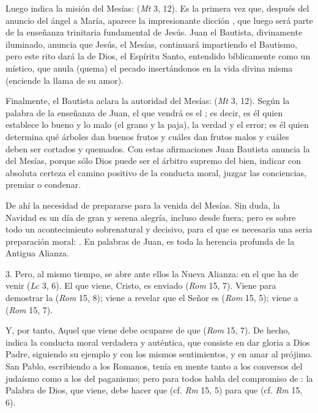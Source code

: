 \begin{body}
	Luego indica la misión del Mesías:  (\emph{Mt} 3, 12). Es la primera vez que, después del anuncio del ángel a María, aparece la impresionante dicción , que luego será parte de la enseñanza trinitaria fundamental de Jesús. Juan el Bautista, divinamente iluminado, anuncia que Jesús, el Mesías, continuará impartiendo el Bautismo, pero este rito dará la  de Dios, el Espíritu Santo, entendido bíblicamente como un  místico, que anula (quema) el pecado insertándonos en la vida divina misma (enciende la llama de su amor).
	
	Finalmente, el Bautista aclara la autoridad del Mesías:  (\emph{Mt} 3, 12). Según la palabra de la enseñanza de Juan, el que vendrá es el ; es decir, es él quien establece lo bueno y lo malo (el grano y la paja), la verdad y el error; es él quien determina qué árboles dan buenos frutos y cuáles dan frutos malos y cuáles deben ser cortados y quemados. Con estas afirmaciones Juan Bautista anuncia la  del Mesías, porque sólo Dios puede ser el árbitro supremo del bien, indicar con absoluta certeza el camino positivo de la conducta moral, juzgar las conciencias, premiar o condenar.
	
	De ahí la necesidad de prepararse para la venida del Mesías. Sin duda, la Navidad es un día de gran y serena alegría, incluso desde fuera; pero es sobre todo un acontecimiento sobrenatural y decisivo, para el que es necesaria una seria preparación moral: . En palabras de Juan, es toda la herencia profunda de la Antigua Alianza.
	
	3. Pero, al mismo tiempo, se abre ante ellos la Nueva Alianza: en el que ha de venir  (\emph{Lc} 3, 6). El que viene, Cristo, es enviado  (\emph{Rom} 15, 7). Viene para demostrar la  (\emph{Rom} 15, 8); viene a revelar que el Señor es  (\emph{Rom} 15, 5); viene a  (\emph{Rom} 15, 7).
	
	Y, por tanto, Aquel que viene debe ocuparse de que  (\emph{Rom} 15, 7). De hecho, indica la conducta moral verdadera y auténtica, que consiste en dar gloria a Dios Padre, siguiendo su ejemplo y con los mismos sentimientos, y en amar al prójimo. San Pablo, escribiendo a los Romanos, tenía en mente tanto a los conversos del judaísmo como a los del paganismo; pero para todos habla del compromiso de : la Palabra de Dios, que viene, debe hacer que  (cf. \emph{Rm} 15, 5) para que  (cf. \emph{Rm} 15, 6).
	

\end{body}
